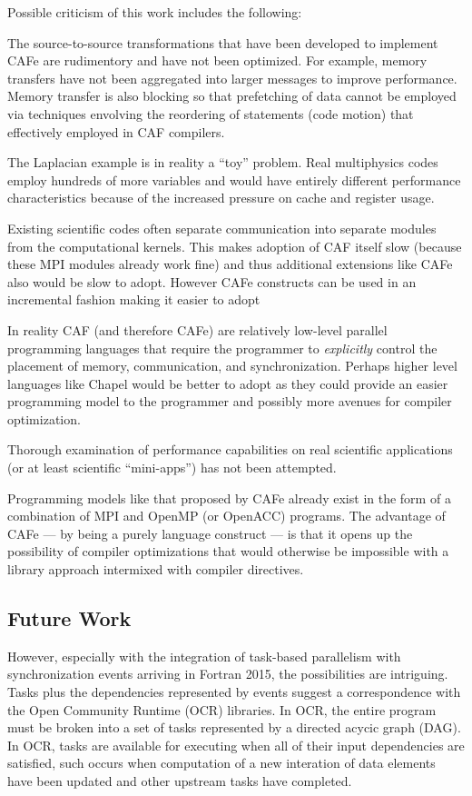 Possible criticism of this work includes the following:
\item
  The source-to-source transformations that have been developed to implement CAFe
  are rudimentory and have not been optimized.  For example, memory transfers have
  not been aggregated into larger messages to improve performance.  Memory transfer
  is also blocking so that prefetching of data cannot be employed via techniques
  envolving the reordering of statements (code motion) that effectively employed in
  CAF compilers.
\item
  The Laplacian example is in reality a ``toy'' problem.  Real multiphysics codes
  employ hundreds of more variables and would have entirely different performance
  characteristics because of the increased pressure on cache and register usage.
\item
  Existing scientific codes often separate communication into separate modules from
  the computational kernels.  This makes adoption of CAF itself slow (because these
  MPI modules already work fine) and thus additional extensions like CAFe also
  would be slow to adopt. However CAFe constructs can be used in an incremental
  fashion making it easier to adopt
\item
  In reality CAF (and therefore CAFe) are relatively low-level parallel programming
  languages that require the programmer to \emph{explicitly} control the placement
  of memory, communication, and synchronization.  Perhaps higher level languages like
  Chapel would be better to adopt as they could provide an easier programming model
  to the programmer and possibly more avenues for compiler optimization.
\item
  Thorough examination of performance capabilities on real scientific applications
  (or at least scientific ``mini-apps'') has not been attempted.
\item
  Programming models like that proposed by CAFe already exist in the form of a combination
  of MPI and OpenMP (or OpenACC) programs.  The advantage of CAFe --- by being a purely
  language construct --- is that it opens up the possibility of compiler optimizations
  that would otherwise be impossible with a library approach intermixed with compiler directives.

\subsection{Future Work}

However, especially with the integration of task-based parallelism with synchronization
events arriving in Fortran 2015, the possibilities are intriguing.  Tasks plus the
dependencies represented by events suggest a correspondence with the Open Community
Runtime (OCR) libraries.  In OCR, the entire program must be broken into a set of tasks
represented by a directed acycic graph (DAG).  In OCR, tasks are available for executing
when all of their input dependencies are satisfied, such occurs when computation of a new
interation of data elements have been updated and other upstream tasks have completed.

